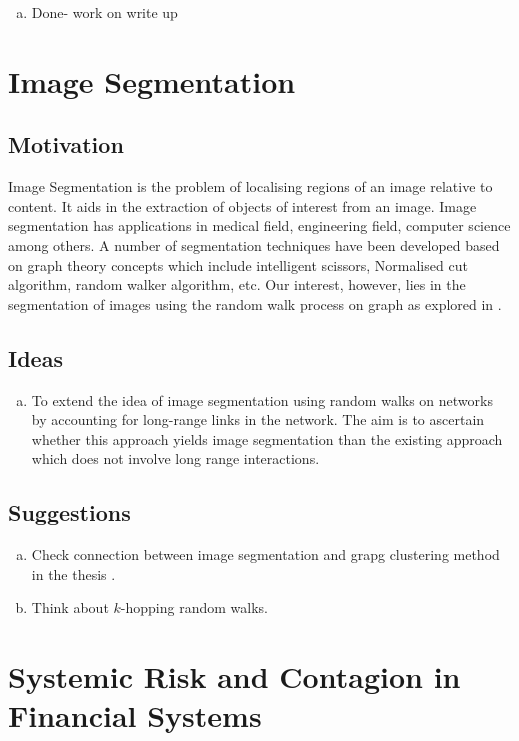 \documentclass[10pt,a4paper]{article}
\begin{document}
    \begin{enumerate}[a)]
    	\item  Done- work on write up
    \end{enumerate}
    
    
    \section{Image Segmentation}
    \subsection{Motivation}
    Image Segmentation is the problem of localising regions of an image relative to content. It aids in the extraction of objects of interest from an image. Image segmentation has applications in medical field, engineering field, computer science among others. A number of segmentation techniques have been developed based on graph theory concepts which include intelligent scissors, Normalised cut algorithm, random walker algorithm, etc. Our interest, however, lies in the segmentation of images using the random walk process on graph as explored in \citep{grady2006random}.
    \subsection{Ideas}
    \begin{enumerate}[a)]
    	\item To extend the idea of image segmentation using random walks on networks by accounting for long-range links in the network. The aim is to ascertain whether this approach yields image segmentation than the existing approach which does not involve long range interactions.
    \end{enumerate}
     \subsection{Suggestions}
     
     \begin{enumerate}[a)]
     	\item  Check connection between image segmentation and grapg clustering method in the thesis \citep{xiao2009graph}.
     	\item Think about $k$-hopping random walks.
     \end{enumerate}

    \section{Systemic Risk and Contagion in Financial Systems}
\end{document}
